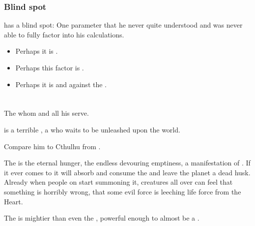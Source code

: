 \subsubsection{Blind spot}
\Daggerrain{} has a blind spot: 
One parameter that he never quite understood and was never able to fully factor into his calculations. 

\begin{itemize}
  \item 
    Perhaps it is . 
  \item 
    Perhaps this factor is .
  \item 
    Perhaps it is  and  against the \banes.
\end{itemize}















\section{\Voidbringer}
The \baneking{} whom \Daggerrain{} and all his \banes{} serve. 

\Voidbringer{} is a terrible , a  who waits to be unleashed upon the world. 

Compare him to Cthulhu from .

The \Voidbringer{} is the eternal hunger, the endless devouring emptiness, a manifestation of \Bane{} . If it ever comes to \Miith{} it will absorb and consume the  and leave the planet a dead husk. Already when people on \Miith{} start summoning it, creatures all over \Miith{} can feel that something is horribly wrong, that some evil force is leeching life force from the Heart.

The \Voidbringer{} is mightier than even the \xss, powerful enough to almost be a . 

